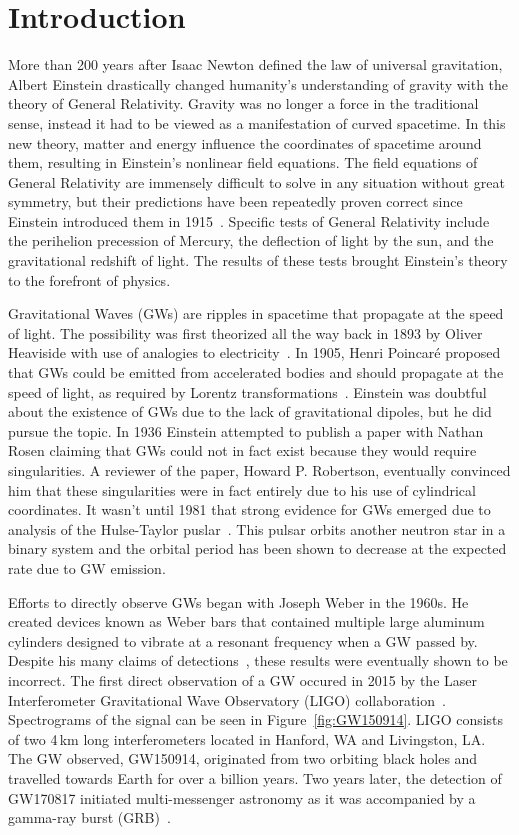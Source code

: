 \chapter{Introduction}

More than 200 years after Isaac Newton defined the law of universal gravitation, Albert Einstein drastically changed humanity's understanding of gravity with the theory of General Relativity. Gravity was no longer a force in the traditional sense, instead it had to be viewed as a manifestation of curved spacetime. In this new theory, matter and energy influence the coordinates of spacetime around them, resulting in Einstein's nonlinear field equations. The field equations of General Relativity are immensely difficult to solve in any situation without great symmetry, but their predictions have been repeatedly proven correct since Einstein introduced them in 1915~\cite{einstein1916naherungsweise}. Specific tests of General Relativity include the perihelion precession of Mercury, the deflection of light by the sun, and the gravitational redshift of light. The results of these tests brought Einstein's theory to the forefront of physics.

Gravitational Waves (GWs) are ripples in spacetime that propagate at the speed of light. The possibility was first theorized all the way back in 1893 by Oliver Heaviside with use of analogies to electricity~\cite{heaviside1893gravitational}. In 1905, Henri Poincar\'e proposed that GWs could be emitted from accelerated bodies and should propagate at the speed of light, as required by Lorentz transformations~\cite{goldberg1967henri}. Einstein was doubtful about the existence of GWs due to the lack of gravitational dipoles, but he did pursue the topic. In 1936 Einstein attempted to publish a paper with Nathan Rosen claiming that GWs could not in fact exist because they would require singularities. A reviewer of the paper, Howard P. Robertson, eventually convinced him that these singularities were in fact entirely due to his use of cylindrical coordinates. It wasn't until 1981 that strong evidence for GWs emerged due to analysis of the Hulse-Taylor puslar~\cite{weisberg1981gravitational}. This pulsar orbits another neutron star in a binary system and the orbital period has been shown to decrease at the expected rate due to GW emission.

Efforts to directly observe GWs began with Joseph Weber in the 1960s. He created devices known as Weber bars that contained multiple large aluminum cylinders designed to vibrate at a resonant frequency when a GW passed by. Despite his many claims of detections~\cite{weber1969evidence}, these results were eventually shown to be incorrect. The first direct observation of a GW occured in 2015 by the Laser Interferometer Gravitational Wave Observatory (LIGO) collaboration~\cite{GW150914}. Spectrograms of the signal can be seen in Figure~\ref{fig:GW150914}. LIGO consists of two 4\,km long interferometers located in Hanford, WA and Livingston, LA. The GW observed, GW150914, originated from two orbiting black holes and travelled towards Earth for over a billion years. Two years later, the detection of GW170817 initiated multi-messenger astronomy as it was accompanied by a gamma-ray burst (GRB)~\cite{GW170817}. 

